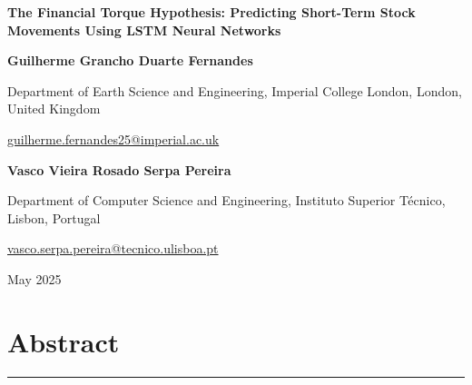\documentclass[letterpaper]{article}
\begin{document}
\begin{titlepage}
    \centering
    \vspace*{\fill} %
    {\LARGE\bfseries The Financial Torque Hypothesis: Predicting Short-Term Stock Movements Using LSTM Neural Networks\par}
    \vspace{1cm} %
    \vspace{2cm}
    {\Large\bfseries Guilherme Grancho Duarte Fernandes\par}
    \vspace{0.5cm} %
    {\large Department of Earth Science and Engineering, Imperial College London, London, United Kingdom\par}
    {\large \href{mailto:guilherme.fernandes25@imperial.ac.uk}{guilherme.fernandes25@imperial.ac.uk}\par}
    \vspace{1cm} %
    {\Large\bfseries Vasco Vieira Rosado Serpa Pereira\par}
    \vspace{0.5cm}
    {\large Department of Computer Science and Engineering, Instituto Superior Técnico, Lisbon, Portugal\par}
    {\large \href{mailto:vasco.serpa.pereira@tecnico.ulisboa.pt}{vasco.serpa.pereira@tecnico.ulisboa.pt}\par}
    \vspace{3cm} %
    {\large May 2025\par}
    \vspace*{\fill} %
\end{titlepage}


\newpage

\section*{Abstract}

\noindent\rule{\textwidth}{1pt}
\vspace{0.1mm}
\end{document}
